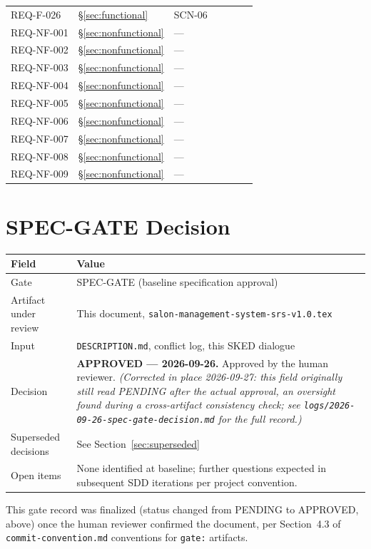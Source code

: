 \documentclass[11pt,a4paper]{article}
\begin{document}
\begin{longtable}{L{1.7cm}L{2.3cm}L{1.6cm}L{1.4cm}L{1.4cm}L{1.4cm}L{1.4cm}}
REQ-F-026 & \S\ref{sec:functional} & SCN-06 & & & & \\
REQ-NF-001 & \S\ref{sec:nonfunctional} & --- & & & & \\
REQ-NF-002 & \S\ref{sec:nonfunctional} & --- & & & & \\
REQ-NF-003 & \S\ref{sec:nonfunctional} & --- & & & & \\
REQ-NF-004 & \S\ref{sec:nonfunctional} & --- & & & & \\
REQ-NF-005 & \S\ref{sec:nonfunctional} & --- & & & & \\
REQ-NF-006 & \S\ref{sec:nonfunctional} & --- & & & & \\
REQ-NF-007 & \S\ref{sec:nonfunctional} & --- & & & & \\
REQ-NF-008 & \S\ref{sec:nonfunctional} & --- & & & & \\
REQ-NF-009 & \S\ref{sec:nonfunctional} & --- & & & & \\
\bottomrule
\end{longtable}

\section{SPEC-GATE Decision}
\label{sec:gate}

\begin{tabularx}{\textwidth}{@{}lX@{}}
\toprule
Field & Value \\
\midrule
Gate & SPEC-GATE (baseline specification approval) \\
Artifact under review & This document, \texttt{salon-management-system-srs-v1.0.tex} \\
Input & \texttt{DESCRIPTION.md}, conflict log, this SKED dialogue \\
Decision & \textbf{APPROVED --- 2026-09-26.} Approved by the human
  reviewer. \emph{(Corrected in place 2026-09-27: this field originally
  still read PENDING after the actual approval, an oversight found during
  a cross-artifact consistency check; see
  \texttt{logs/2026-09-26-spec-gate-decision.md} for the full record.)} \\
Superseded decisions & See Section~\ref{sec:superseded} \\
Open items & None identified at baseline; further questions expected in
  subsequent SDD iterations per project convention. \\
\bottomrule
\end{tabularx}

\noindent This gate record was finalized (status changed from PENDING to
APPROVED, above) once the human reviewer confirmed the document, per
Section~4.3 of \texttt{commit-convention.md} conventions for \texttt{gate:}
artifacts.
\end{document}
